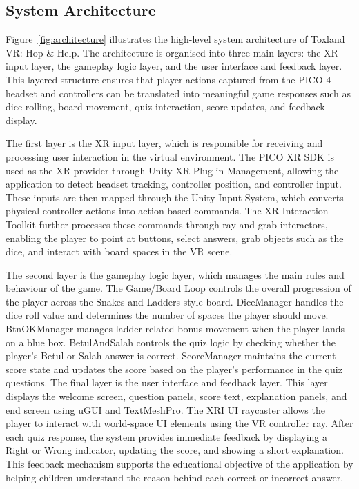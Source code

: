 \documentclass[a4paper,12pt]{article}
\begin{document}
\subsection{System Architecture}

Figure~\ref{fig:architecture} illustrates the high-level system architecture of Toxland VR: Hop \& Help. The architecture is organised into three main layers: the XR input layer, the gameplay logic layer, and the user interface and feedback layer. This layered structure ensures that player actions captured from the PICO 4 headset and controllers can be translated into meaningful game responses such as dice rolling, board movement, quiz interaction, score updates, and feedback display.

The first layer is the XR input layer, which is responsible for receiving and processing user interaction in the virtual environment. The PICO XR SDK is used as the XR provider through Unity XR Plug-in Management, allowing the application to detect headset tracking, controller position, and controller input. These inputs are then mapped through the Unity Input System, which converts physical controller actions into action-based commands. The XR Interaction Toolkit further processes these commands through ray and grab interactors, enabling the player to point at buttons, select answers, grab objects such as the dice, and interact with board spaces in the VR scene.

The second layer is the gameplay logic layer, which manages the main rules and behaviour of the game. The Game/Board Loop controls the overall progression of the player across the Snakes-and-Ladders-style board. DiceManager handles the dice roll value and determines the number of spaces the player should move. BtnOKManager manages ladder-related bonus movement when the player lands on a blue box. BetulAndSalah controls the quiz logic by checking whether the player’s Betul or Salah answer is correct. ScoreManager maintains the current score state and updates the score based on the player’s performance in the quiz questions.
The final layer is the user interface and feedback layer. This layer displays the welcome screen, question panels, score text, explanation panels, and end screen using uGUI and TextMeshPro. The XRI UI raycaster allows the player to interact with world-space UI elements using the VR controller ray. After each quiz response, the system provides immediate feedback by displaying a Right or Wrong indicator, updating the score, and showing a short explanation. This feedback mechanism supports the educational objective of the application by helping children understand the reason behind each correct or incorrect answer.
\end{document}
